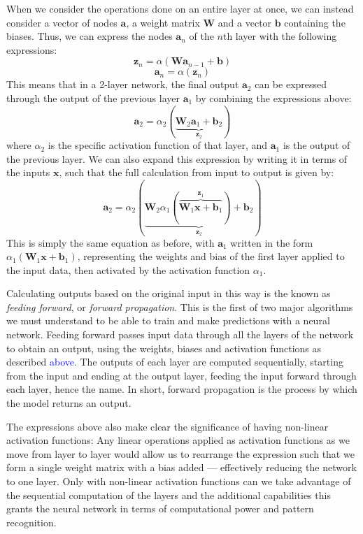 When we consider the operations done on an entire layer at once, we can instead consider a vector of nodes $\boldsymbol{a}$, a weight matrix $\mathbf{W}$ and a vector $\boldsymbol b$ containing the biases. Thus, we can express the nodes $\boldsymbol a_n$ of the $n$th layer with the following expressions:
\[\boldsymbol z_n = \alpha(\mathbf W \boldsymbol a_{n-1} + \boldsymbol b)\]
\[\boldsymbol a_n = \alpha(\boldsymbol z_n)\]
This means that in a 2-layer network, the final output $\boldsymbol a_2$ can be expressed through the output of the previous layer $\boldsymbol{a}_1$ by combining the expressions above:
\[\boldsymbol{a}_2 = \alpha_2(\underbrace{\mathbf W_2 \boldsymbol a_1  + \boldsymbol b_2}_{\boldsymbol z_2})\]
where $\alpha_2$ is the specific activation function of that layer, and $\boldsymbol a_1$ is the output of the previous layer. We can also expand this expression by writing it in terms of the inputs $\boldsymbol{x}$, such that the full calculation from input to output is given by:
\[\boldsymbol{a}_2 = \alpha_2(\underbrace{\mathbf W_2 \alpha_1(\overbrace{\mathbf W_1 \boldsymbol{x} + \boldsymbol b_1}^{\boldsymbol z_1})  + \boldsymbol b_2}_{\boldsymbol z_2})\]
This is simply the same equation as before, with $\boldsymbol a_1$ written in the form $\alpha_1(\mathbf W_1 \boldsymbol{x} + \boldsymbol b_1)$, representing the weights and bias of the first layer applied to the input data, then activated by the activation function $\alpha_1$.

Calculating outputs based on the original input in this way is the known as \emph{feeding forward}, or \emph{forward propagation}. This is the first of two major algorithms we must understand to be able to train and make predictions with a neural network. Feeding forward passes input data through all the layers of the network to obtain an output, using the weights, biases and activation functions as described \textcolor{blue}{above}. The outputs of each layer are computed sequentially, starting from the input and ending at the output layer, feeding the input forward through each layer, hence the name. In short, forward propagation is the process by which the model returns an output.

The expressions above also make clear the significance of having non-linear activation functions: Any linear operations applied as activation functions as we move from layer to layer would allow us to rearrange the expression such that we form a single weight matrix with a bias added –– effectively reducing the network to one layer. Only with non-linear activation functions can we take advantage of the sequential computation of the layers and the additional capabilities this grants the neural network in terms of computational power and pattern recognition.

